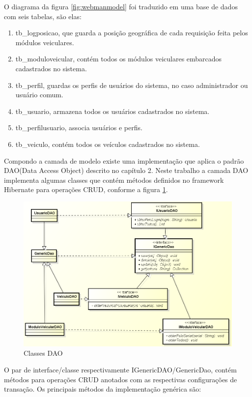 O diagrama da figura \ref{fig:webmanmodel} foi traduzido em uma base de dados com seis tabelas, são elas:

\begin{enumerate}
	\item tb\_logposicao, que guarda a posição geográfica de cada requisição feita pelos módulos veiculares.
	\item tb\_moduloveicular, contém todos os módulos veiculares embarcados cadastrados no sistema.
	\item tb\_perfil, guardas os perfis de usuários do sistema, no caso administrador ou usuário comum.
	\item tb\_usuario, armazena todos os usuários cadastrados no sistema.
	\item tb\_perfilusuario, associa usuários e perfis.
	\item tb\_veiculo, contém todos os veículos cadastrados no sistema.
\end{enumerate}

Compondo a camada de modelo existe uma implementação que aplica o padrão DAO(Data Access Object) descrito no capítulo 2. Neste trabalho a camada DAO implementa algumas classes que contém métodos definidos no framework Hibernate para operações CRUD, conforme a figura \ref{fig:webmandao}.

\begin{figure}[!htb]
	\centering
	\includegraphics[width=\textwidth]{figures/dao_layer.png}
	\caption{Classes DAO}
	\label{fig:webmandao}
\end{figure}

O par de interface/classe respectivamente IGenericDAO/GenericDao, contém métodos para operações CRUD anotados com as respectivas configurações de transação. Os principais métodos da implementação genérica são:

